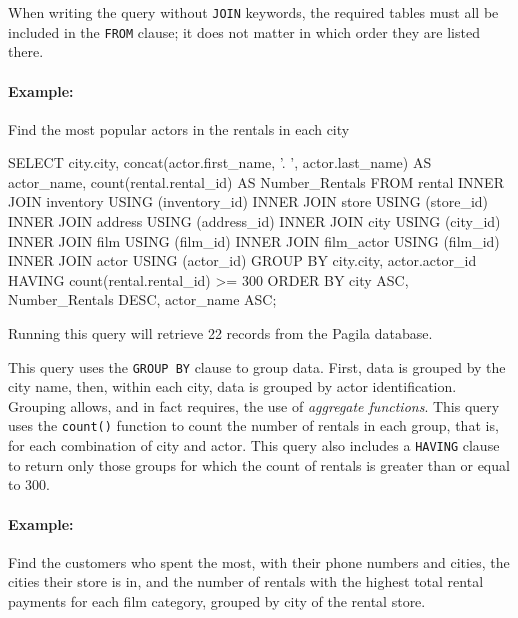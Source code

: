 \begin{withcode}
When writing the query without \texttt{JOIN} keywords, the required tables must all be included in the \texttt{FROM} clause; it does not matter in which order they are listed there.

\paragraph{Example:} Find the most popular actors in the rentals in each city

\begin{sqlcode}
SELECT city.city, 
       concat(actor.first_name, '. ', actor.last_name) AS actor_name,
       count(rental.rental_id) AS Number_Rentals
  FROM rental
  INNER JOIN inventory USING (inventory_id)
  INNER JOIN store USING (store_id)
  INNER JOIN address USING (address_id)
  INNER JOIN city USING (city_id)
  INNER JOIN film USING (film_id)
  INNER JOIN film_actor USING (film_id)
  INNER JOIN actor USING (actor_id)
  GROUP BY city.city, actor.actor_id
  HAVING count(rental.rental_id) >= 300
  ORDER BY city ASC, 
           Number_Rentals DESC, 
           actor_name ASC;
\end{sqlcode}

Running this query will retrieve 22 records from the Pagila database.

This query uses the \texttt{GROUP BY} clause to group data. First, data is grouped by the city name, then, within each city, data is grouped by actor identification. Grouping allows, and in fact requires, the use of \emph{aggregate functions}. This query uses the \texttt{count()} function to count the number of rentals in each group, that is, for each combination of city and actor. This query also includes a \texttt{HAVING} clause to return only those groups for which the count of rentals is greater than or equal to 300. 

\paragraph*{Example:} Find the customers who spent the most, with their phone numbers and cities, the cities their store is in, and the number of rentals with the highest total rental payments for each film category, grouped by city of the rental store.


\end{withcode}
